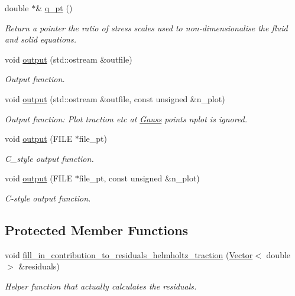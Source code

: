 \begin{DoxyCompactItemize}
double $\ast$\& \hyperlink{classoomph_1_1TimeHarmonicLinElastLoadedByHelmholtzPressureBCElement_a2b836c57f104d02c934615333f306a21}{q\+\_\+pt} ()
\begin{DoxyCompactList}\small\item\em Return a pointer the ratio of stress scales used to non-\/dimensionalise the fluid and solid equations. \end{DoxyCompactList}\item 
void \hyperlink{classoomph_1_1TimeHarmonicLinElastLoadedByHelmholtzPressureBCElement_a1ecf56e825d5af950572efe4208ad307}{output} (std\+::ostream \&outfile)
\begin{DoxyCompactList}\small\item\em Output function. \end{DoxyCompactList}\item 
void \hyperlink{classoomph_1_1TimeHarmonicLinElastLoadedByHelmholtzPressureBCElement_a2cfc5c6af366019bc8d8d9bb42ffae03}{output} (std\+::ostream \&outfile, const unsigned \&n\+\_\+plot)
\begin{DoxyCompactList}\small\item\em Output function\+: Plot traction etc at \hyperlink{classoomph_1_1Gauss}{Gauss} points nplot is ignored. \end{DoxyCompactList}\item 
void \hyperlink{classoomph_1_1TimeHarmonicLinElastLoadedByHelmholtzPressureBCElement_a6a1d8e8ae161b0ca0aa3de8d2a04a409}{output} (F\+I\+LE $\ast$file\+\_\+pt)
\begin{DoxyCompactList}\small\item\em C\+\_\+style output function. \end{DoxyCompactList}\item 
void \hyperlink{classoomph_1_1TimeHarmonicLinElastLoadedByHelmholtzPressureBCElement_aab8bf1e29247d96cef5a0ab8c593de61}{output} (F\+I\+LE $\ast$file\+\_\+pt, const unsigned \&n\+\_\+plot)
\begin{DoxyCompactList}\small\item\em C-\/style output function. \end{DoxyCompactList}\end{DoxyCompactItemize}
\subsection*{Protected Member Functions}
\begin{DoxyCompactItemize}
\item 
void \hyperlink{classoomph_1_1TimeHarmonicLinElastLoadedByHelmholtzPressureBCElement_a42333cd2a19c901bc01d666d85a4e108}{fill\+\_\+in\+\_\+contribution\+\_\+to\+\_\+residuals\+\_\+helmholtz\+\_\+traction} (\hyperlink{classoomph_1_1Vector}{Vector}$<$ double $>$ \&residuals)
\begin{DoxyCompactList}\small\item\em Helper function that actually calculates the residuals. \end{DoxyCompactList}\end{DoxyCompactItemize}
